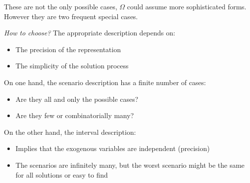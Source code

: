 These are not the only possible cases, $\Omega$ could assume more sophisticated forms. However they are two frequent special cases.

\textit{How to choose?} The appropriate description depends on: 
\begin{itemize}
	\item The precision of the representation
	
	\item The simplicity of the solution process
\end{itemize}

On one hand, the scenario description has a finite number of cases: 
\begin{itemize}
	\item Are they all and only the possible cases? 
	
	\item Are they few or combinatorially many? 
\end{itemize}

On the other hand, the interval description: 
\begin{itemize}
	\item Implies that the exogenous variables are independent (precision)
	
	\item The scenarios are infinitely many, but the worst scenario might be the same for all solutions or easy to find
\end{itemize}

